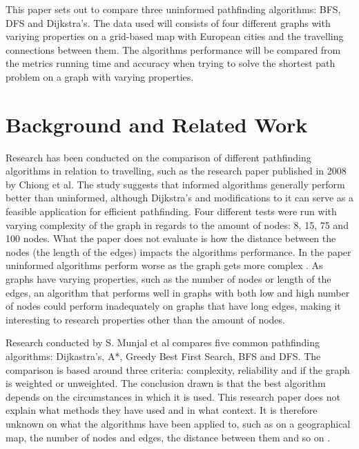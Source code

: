 \documentclass{csfourzero}
\begin{document}
This paper sets out to compare three uninformed pathfinding algorithms: BFS, DFS and Dijkstra's. The data used will consists of four different graphs with variying properties on a grid-based map with European cities and the travelling connections between them. The algorithms performance will be compared from the metrics running time and accuracy when trying to solve the shortest path problem on a graph with varying properties. 

\vspace{1cm} 

\section{Background and Related Work}
\label{sec:lit}
Research has been conducted on the comparison of different pathfinding algorithms in relation to travelling, such as the research paper \cite{4631975} published in 2008 by Chiong et al. The study suggests that informed algorithms generally perform better than uninformed, although Dijkstra's and modifications to it can serve as a feasible application for efficient pathfinding. Four different tests were run with varying complexity of the graph in regards to the amount of nodes: 8, 15, 75 and 100 nodes. What the paper does not evaluate is how the distance between the nodes (the length of the edges) impacts the algorithms performance. In the paper uninformed algorithms perform worse as the graph gets more complex \cite{4631975}. As graphs have varying properties, such as the number of nodes or length of the edges, an algorithm that performs well in graphs with both low and high number of nodes could perform inadequately on graphs that have long edges, making it interesting to research properties other than the amount of nodes. 

Research conducted by S. Munjal et al \cite{ashish2021path} compares five common pathfinding algorithms: Dijkastra's, A*, Greedy Best First Search, BFS and DFS. The comparison is based around three criteria: complexity, reliability and if the graph is weighted or unweighted. The conclusion drawn is that the best algorithm depends on the circumstances in which it is used. This research paper does not explain what methods they have used and in what context. It is therefore unknown on what the algorithms have been applied to, such as on a geographical map, the number of nodes and edges, the distance between them and so on \cite{ashish2021path}. 
\end{document}

